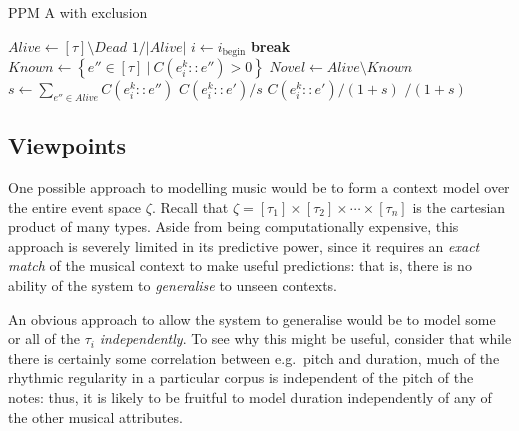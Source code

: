 \documentclass[12pt,a4paper,twoside,openright]{report}
\newcommand{\set}[1]{ \left\{ #1 \right\} }
\begin{document}
\begin{algorithm}[H]
  \caption{PPM A with exclusion}
  \label{alg:ppm-a}
  \begin{algorithmic}[1]
      \State $\textit{Alive} \gets [\tau] \setminus \textit{Dead}$
      \State \Return $1 / |\textit{Alive}|$ 
      \EndIf
      \State $i \gets i_{\mathrm{begin}}$
       \textbf{break}
        \EndIf       
      \EndFor 
      \State $\textit{Known} \gets \set{ e'' \in [\tau]\ |\ C(e_i^k :: e'') > 0 }$
      \State $\textit{Novel} \gets Alive \setminus Known$ 
      \State $s \gets \sum_{e'' \in \textit{Alive}} C(e_i^k :: e'')$ 
        \State \Return $C(e_i^k :: e') / s$ 
      \EndIf
      \State \Return $C(e_i^k::e') / (1 + s)$ 
      \EndIf
      \State \Return {}$ / (1
      + s)$ 
    \EndFunction
  \end{algorithmic}
\end{algorithm}

\subsection{Viewpoints}\label{sec:mvs-formalism}

One possible approach to modelling music would be to form a context model over
the entire event space $\zeta$.  Recall that $\zeta = [\tau_1] \times [\tau_2]
\times \cdots \times [\tau_n]$ is the cartesian product of many types. Aside
from being computationally expensive, this approach is severely limited in its
predictive power, since it requires an \emph{exact match} of the musical
context to make useful predictions: that is, there is no ability of the system
to \emph{generalise} to unseen contexts.

An obvious approach to allow the system to generalise would be to model some or
all of the $\tau_i$ \emph{independently}. To see why this might be useful,
consider that while there is certainly some correlation between e.g.\ pitch and
duration, much of the rhythmic regularity in a particular corpus is independent
of the pitch of the notes: thus, it is likely to be fruitful to model duration
independently of any of the other musical attributes.
\end{document}
